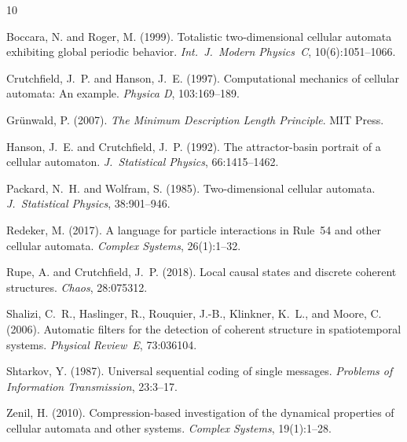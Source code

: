 \documentclass[letterpaper]{article}
\theoremstyle{definition}
\theoremstyle{remark}
\begin{document}
\footnotesize

\begin{thebibliography}{10}

Boccara, N. and Roger, M. (1999).
Totalistic two-dimensional cellular automata exhibiting global periodic behavior.
\emph{Int.\ J.\ Modern Physics~C}, 10(6):1051--1066.

Crutchfield, J.~P. and Hanson, J.~E. (1997).
Computational mechanics of cellular automata: An example.
\emph{Physica D}, 103:169--189.

Gr{\"u}nwald, P. (2007).
\emph{The Minimum Description Length Principle}.
MIT Press.

Hanson, J.~E. and Crutchfield, J.~P. (1992).
The attractor-basin portrait of a cellular automaton.
\emph{J.\ Statistical Physics}, 66:1415--1462.

Packard, N.~H. and Wolfram, S. (1985).
Two-dimensional cellular automata.
\emph{J.\ Statistical Physics}, 38:901--946.

Redeker, M. (2017).
A language for particle interactions in Rule~54 and other cellular automata.
\emph{Complex Systems}, 26(1):1--32.

Rupe, A. and Crutchfield, J.~P. (2018).
Local causal states and discrete coherent structures.
\emph{Chaos}, 28:075312.

Shalizi, C.~R., Haslinger, R., Rouquier, J.-B., Klinkner, K.~L., and Moore, C. (2006).
Automatic filters for the detection of coherent structure in spatiotemporal systems.
\emph{Physical Review~E}, 73:036104.

Shtarkov, Y. (1987).
Universal sequential coding of single messages.
\emph{Problems of Information Transmission}, 23:3--17.

Zenil, H. (2010).
Compression-based investigation of the dynamical properties of cellular automata and other systems.
\emph{Complex Systems}, 19(1):1--28.

\end{thebibliography}
\end{document}
